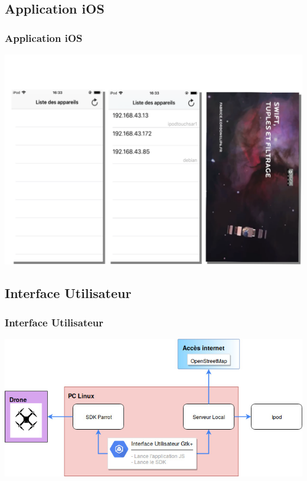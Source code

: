 \documentclass{beamer}
\begin{document}
	
	
	\begin{frame}
		\section{Application iOS}
		\begin{center}
		\frametitle{Application iOS}
        \includegraphics[scale=0.37]{Architecture_logicielle_composants/ipod.png}
		\end{center}
	\end{frame}
	
	
	
	\begin{frame}
		\section{Interface Utilisateur}
		\begin{center}
		\frametitle{Interface Utilisateur}
        \includegraphics[scale=0.4]{Architecture_logicielle_composants/Interface_utilisateur.jpg}
		\end{center}
	\end{frame}
	
\end{document}
